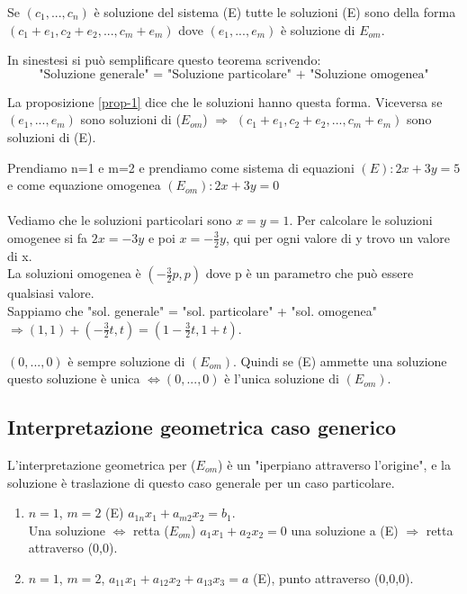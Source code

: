 \begin{theorem}
Se $(c_1,...,c_n)$ è soluzione del sistema (E) tutte le soluzioni (E) sono della forma $(c_1 + e_1, c_2 + e_2, ..., c_m + e_m)$ dove $(e_1,...,e_m)$ è soluzione di $E_{om}$.
\end{theorem}
In sinestesi si può semplificare questo teorema scrivendo:
\begin{equation}
    \text{"Soluzione generale" = "Soluzione particolare" + "Soluzione omogenea"}
\end{equation}

\begin{demostration}
La proposizione \ref{prop-1} dice che le soluzioni hanno questa forma. Viceversa se $(e_1,...,e_m)$ sono soluzioni di ($E_{om}$) $\Longrightarrow$ $(c_1 + e_1, c_2 + e_2, ..., c_m + e_m)$ sono soluzioni di (E).
\end{demostration}

\begin{example}
Prendiamo n=1 e m=2 e prendiamo come sistema di equazioni $(E): 2x + 3y = 5$ e come equazione omogenea $(E_{om}): 2x + 3y = 0$\\\\
Vediamo che le soluzioni particolari sono $x = y = 1$. Per calcolare le soluzioni omogenee si fa $2x = -3y$ e poi $x = -\frac{3}{2}y$, qui per ogni valore di y trovo un valore di x. \\
La soluzioni omogenea è $(-\frac{3}{2}p, p)$ dove p è un parametro che può essere qualsiasi valore.\\
Sappiamo che "sol. generale" = "sol. particolare" + "sol. omogenea" $\Rightarrow (1,1) + (-\frac{3}{2}t,t) = (1 - \frac{3}{2}t, 1 + t)$.
\end{example}

\begin{observation}
$(0,...,0)$ è sempre soluzione di $(E_{om})$. Quindi se (E) ammette una soluzione questo soluzione è unica $\Longleftrightarrow (0,...,0)$ è l'unica soluzione di $(E_{om})$.
\end{observation}

\subsection{Interpretazione geometrica caso generico}
L'interpretazione geometrica per ($E_{om}$) è un "iperpiano attraverso l'origine", e la soluzione è traslazione di questo caso generale per un caso particolare.
\begin{enumerate}
    \item $n=1$, $m=2$ (E) $a_{1n}x_1 + a_{m2}x_2 = b_1$.\\
    Una soluzione $\Longleftrightarrow$ retta ($E_{om}$) $a_1x_1 + a_2x_2 = 0$ una soluzione a (E) $\Rightarrow$ retta attraverso (0,0).
    \item $n=1$, $m=2$, $a_{11}x_1 + a_{12}x_2 + a_{13}x_3 = a$ (E), punto attraverso (0,0,0).
\end{enumerate}

